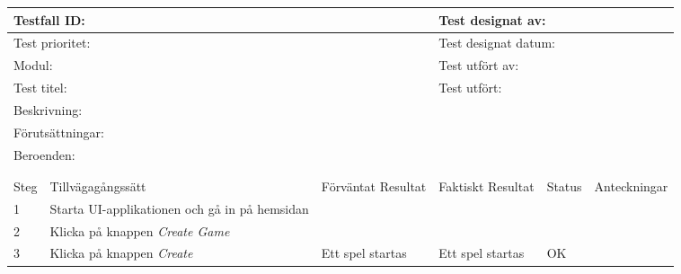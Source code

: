 \documentclass[10pt]{article}
\begin{document}
\begin{tabular}{| p{1cm}|  p{3cm} | p{3cm}| p{3cm}| p{2cm}| p{3cm}|}
	\hline
	  \multicolumn{3}{|l|}{Testfall ID:}&\multicolumn{3}{|l|}{Test designat av:}\\
	  \hline
	  \multicolumn{3}{|l|}{Test prioritet:}&\multicolumn{3}{|l|}{Test designat datum:}\\
	  \hline
	  \multicolumn{3}{|l|}{Modul:}&\multicolumn{3}{|l|}{Test utfört av:}\\
	  \hline
	  \multicolumn{3}{|l|}{Test titel:}&\multicolumn{3}{|l|}{Test utfört:}\\
	  \hline
	  \multicolumn{6}{|p{\textwidth}|}{Beskrivning:}\\
	  \hline
	  \multicolumn{6}{|p{\textwidth}|}{Förutsättningar:}\\
	  \hline
	  \multicolumn{6}{|p{\textwidth}|}{Beroenden:}\\
  
	\hline
	\multicolumn{6}{|l|}{}\\
	\multicolumn{6}{|l|}{}\\
      	\hline
	Steg&Tillvägagångssätt&Förväntat Resultat&Faktiskt Resultat&Status&Anteckningar \\
	\hline
	1&Starta UI-applikationen och gå in på hemsidan&&&&\\
      	\hline
	2&Klicka på knappen \textit{Create Game}&&&&\\
      	\hline
	3&Klicka på knappen \textit{Create}&Ett spel startas&Ett spel startas& OK&\\
      	\hline
\end{tabular}
\end{document}
